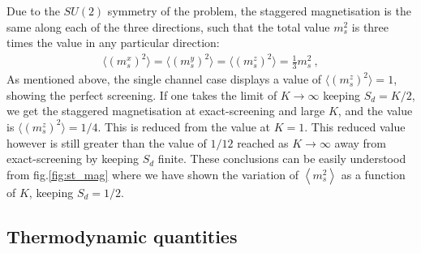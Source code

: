 \documentclass[10pt]{iopart}
\begin{document}
Due to the $SU(2)$ symmetry of the problem, the staggered magnetisation is the same along each of the three directions, such that the total value \(m_s^2\) is three times the value in any particular direction:
\begin{eqnarray}
\langle(m_s^x)^2\rangle=\langle(m_s^y)^2\rangle=\langle(m_s^z)^2\rangle=\frac{1}{3}m_s^2~,
\end{eqnarray}
As mentioned above, the single channel case displays a value of $\langle (m_s^z)^2 \rangle =1$, showing the perfect screening. If one takes the limit of \(K \to \infty\) keeping \(S_d = K/2\), we get the staggered magnetisation at exact-screening and large \(K\), and the value is $\langle (m_s^z)^2 \rangle =1/4$. This is reduced from the value at \(K=1\). This reduced value however is still greater than the value of \(1/12\) reached as \(K\to \infty\) away from exact-screening by keeping \(S_d\) finite. These conclusions can be easily understood from fig.\ref{fig:st_mag} where we have shown the variation of \(\left<m_s^2 \right>\) as a function of \(K\), keeping \(S_d=1/2\).


\subsection{Thermodynamic quantities}
\end{document}
